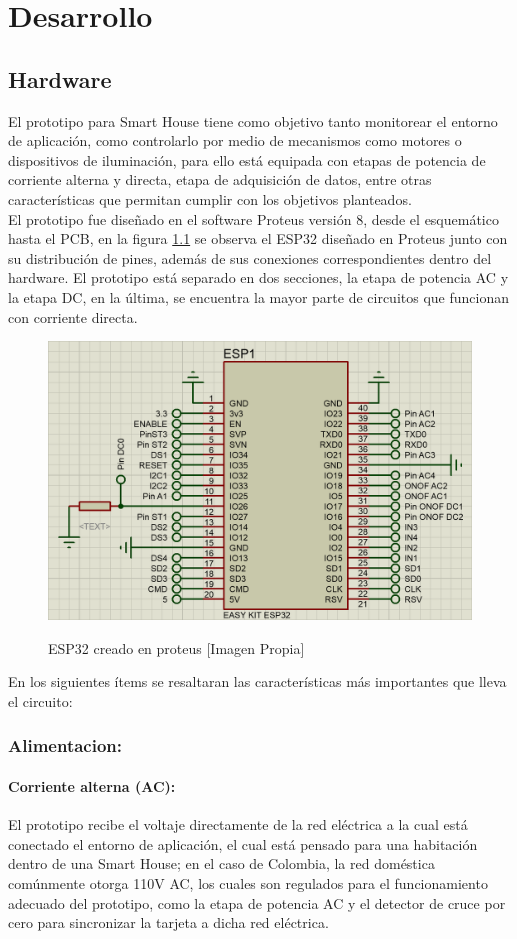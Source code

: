 \chapter{Desarrollo}

\section{Hardware}

El prototipo para Smart House tiene como objetivo tanto monitorear el entorno de aplicación, como controlarlo por medio de mecanismos como motores o dispositivos de iluminación, para ello está equipada con etapas de potencia de corriente alterna y directa, etapa de adquisición de datos, entre otras características que permitan cumplir con los objetivos planteados.\\ 

El prototipo fue diseñado en el software Proteus versión 8, desde el esquemático hasta el PCB, en la figura \ref{fig:esp32} se observa el ESP32 diseñado en Proteus junto con su distribución de pines, además de sus conexiones correspondientes dentro del hardware. El prototipo está separado en dos secciones, la etapa de potencia AC y la etapa DC, en la última, se encuentra la mayor parte de circuitos que funcionan con corriente directa.\\

\begin{figure}[H]
	\centering
	\caption{ESP32 creado en proteus [Imagen Propia]}
	\includegraphics[width=0.5\linewidth]{Imagenes/ESP32}	
	\label{fig:esp32}
\end{figure}

En los siguientes ítems se resaltaran las características más importantes que lleva el circuito:\\

	\subsection{Alimentacion:}
	
	\subsubsection{Corriente alterna (AC):}
		El prototipo recibe el voltaje directamente de la red eléctrica a la cual está conectado el entorno de aplicación, el cual está pensado para una habitación dentro de una Smart House; en el caso de Colombia, la red doméstica comúnmente otorga 110V AC, los cuales son regulados para el funcionamiento adecuado del prototipo,  como la etapa de potencia AC y el detector de cruce por cero para sincronizar la tarjeta a dicha red eléctrica.\\
		
